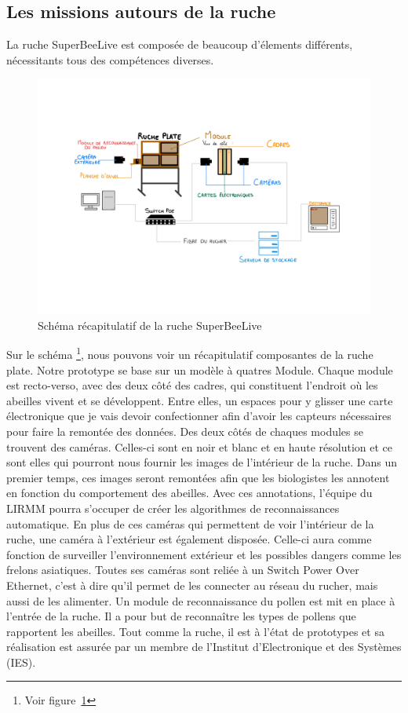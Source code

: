 \documentclass[11pt,french,a4paper]{report}
\begin{document}
\subsection{Les missions autours de la ruche}
La ruche SuperBeeLive est composée de beaucoup d'élements différents, nécessitants tous des compétences diverses.
\begin{figure}[!h]
    \centering 
    \includegraphics[width=20cm]{./img/resume_hive.jpg}
    \caption{Schéma récapitulatif de la ruche SuperBeeLive}
    \label{resume_hive}
\end{figure}
Sur le schéma \footnote{Voir figure \ref{resume_hive}}, nous pouvons voir un récapitulatif composantes de la ruche plate. 
Notre prototype se base sur un modèle à quatres Module. Chaque module est recto-verso, avec des deux côté des cadres, 
qui constituent l'endroit où les abeilles vivent et se développent. Entre elles, un espaces pour y glisser une carte électronique 
que je vais devoir confectionner afin d'avoir les capteurs nécessaires pour faire la remontée des données. 
Des deux côtés de chaques modules se trouvent des caméras. Celles-ci sont en noir et blanc et en haute résolution et ce sont elles
qui pourront nous fournir les images de l'intérieur de la ruche. Dans un premier temps, ces images seront remontées afin 
que les biologistes les annotent en fonction du comportement des abeilles. Avec ces annotations, l'équipe du LIRMM pourra s'occuper 
de créer les algorithmes de reconnaissances automatique. En plus de ces caméras qui permettent de voir l'intérieur de la ruche, une caméra à 
l'extérieur est également disposée. Celle-ci aura comme fonction de surveiller l'environnement extérieur et les possibles dangers comme
les frelons asiatiques. Toutes ses caméras sont reliée à un Switch Power Over Ethernet, c'est à dire qu'il permet de les connecter au réseau
du rucher, mais aussi de les alimenter. Un module de reconnaissance du pollen est mit en place à l'entrée de la ruche. Il a pour but 
de reconnaître les types de pollens que rapportent les abeilles. Tout comme la ruche, il est à l'état de prototypes et sa réalisation 
est assurée par un membre de l'Institut d'Electronique et des Systèmes (IES). 
\end{document}

